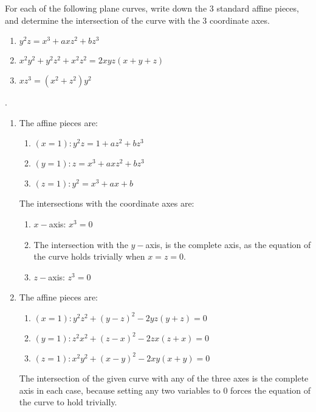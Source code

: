 \documentclass[12pt]{article}
\begin{document}
\begin{prob}
    For each of the following plane curves, write down the 3 standard affine pieces, and determine the intersection of the curve with the 3 coordinate axes.
    \begin{enumerate}[label = (\alph*)]
        \item \( y^2z = x^3 + axz^2 + bz^3 \)
        \item \( x^2y^2 + y^2z^2 + x^2z^2 = 2xyz(x+y+z) \)
        \item \( xz^3=(x^2+z^2)y^2 \)
    \end{enumerate}
\end{prob}
\sol. \begin{enumerate}[label = (\alph*)]
    \item The affine pieces are:
          \begin{enumerate}[label = (\roman*)]
              \item \( (x=1): y^2z = 1+az^2+bz^3 \)
              \item \( (y=1): z = x^3+axz^2+bz^3 \)
              \item \( (z=1): y^2=x^3+ax+b \)
          \end{enumerate}

          The intersections with the coordinate axes are:
          \begin{enumerate}[label = (\roman*)]
              \item \( x- \)axis: \( x^3=0 \)
              \item The intersection with the \( y- \)axis, is the complete axis, as the equation of the curve holds trivially when \( x=z=0 \).
              \item \( z- \)axis: \( z^3=0 \)
          \end{enumerate}
          \smallskip

    \item The affine pieces are:
          \begin{enumerate}[label = (\roman*)]
              \item \( (x=1): y^2z^2 + (y-z)^2-2yz(y+z)=0 \)
              \item \( (y=1): z^2x^2 + (z-x)^2-2zx(z+x)=0 \)
              \item \( (z=1): x^2y^2 + (x-y)^2-2xy(x+y)=0 \)
          \end{enumerate}
          The intersection of the given curve with any of the three axes is the complete axis in each case, because setting any two variables to 0 forces the equation of the curve to hold trivially.
          \smallskip


\end{enumerate}
\end{document}
